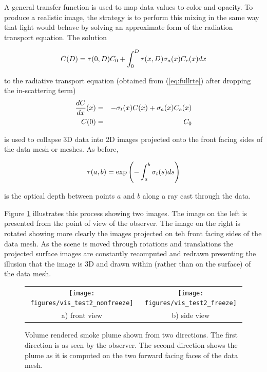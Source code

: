 A general transfer function is used to map data values to color and opacity. To produce a realistic image, the strategy is to perform this mixing in the same way that light would behave by solving an approximate form of the radiation transport equation.  The solution

\begin{equation}
\label{eq:rtesoln}
 C(D)=\tau(0,D)C_0 + \int_0^D\tau(x,D)\sigma_a(x)C_e(x) dx
\end{equation}

to the radiative transport equation (obtained from (\ref{eq:fullrte}) after dropping the in-scattering term)
\begin{eqnarray*}
\frac{dC}{dx}(x)&=&-\sigma_t(x) C(x) + \sigma_a(x) C_e(x)\\
 C(0)&=&C_0\nonumber
\end{eqnarray*}

is used to collapse 3D data into 2D images projected onto the front facing sides of the data mesh or meshes. As before,

\begin{equation}
\label{eq:optdepth}
\tau(a,b)=\exp\left({-\int_a^b \sigma_t(s) ds}\right)
\end{equation}

is the optical depth between points $a$ and $b$ along a ray cast through the data.  

Figure \ref{fig:volplume_example} illustrates this process showing two images.  The image on the left is presented from the point of view of the observer.  The image on the right is rotated showing more clearly the images projected on teh front facing sides of the data mesh.  As the scene is moved through rotations and translations the projected surface images are constantly recomputed and redrawn presenting the illusion that the image is 3D and drawn within (rather than on the surface) of the data mesh.

\begin{figure}[\figoptions]
\begin{center}
\begin{tabular}{cc}
\texttt{[image: figures/vis\_test2\_nonfreeze]}&
\texttt{[image: figures/vis\_test2\_freeze]}\\
a) front view&b) side view\\
\end{tabular}
\end{center}
\caption[Volume rendered smoke plume shown from two directions.]{Volume rendered smoke plume shown from two directions.
The first direction is as seen by the observer.  The second direction shows the plume as it is computed on the two forward facing faces of the data mesh.
}
\label{fig:volplume_example}
\end{figure}

